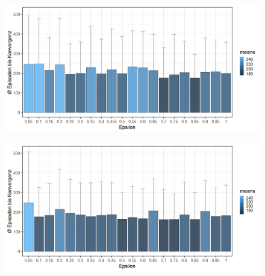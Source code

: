 \begin{figure}[H]
    \centering
    \begin{minipage}{.5\textwidth}
      \centering
      \includegraphics[width=\textwidth]{images/SimpleZ1B2QLearningA}
      \label{fig:test1}
    \end{minipage}%
    \begin{minipage}{.5\textwidth}
      \centering
      \includegraphics[width=\textwidth]{images/SimpleZ1B2SarsaA}
      \label{fig:test2}
    \end{minipage}
\end{figure}

